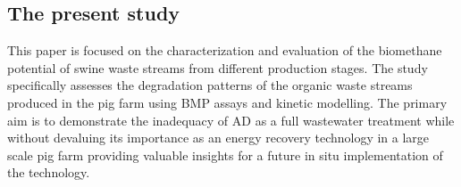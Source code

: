 \subsection{The present study}
This paper is focused on the characterization and evaluation of the biomethane potential of swine waste streams from different production stages. The study specifically assesses the degradation patterns of the organic waste streams produced in the pig farm using BMP assays and kinetic modelling. The primary aim is to demonstrate the inadequacy of AD as a full wastewater treatment while  without devaluing its importance as an energy recovery technology in a large scale pig farm providing valuable insights for a future in situ implementation of the technology.